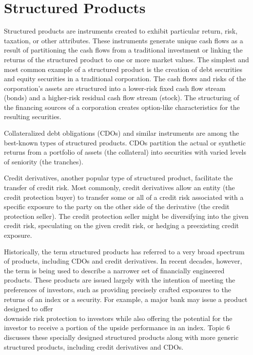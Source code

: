 \documentclass[11pt]{article}
\begin{document}
\section*{Structured Products}
Structured products are instruments created to exhibit particular return, risk, taxation, or other attributes. These instruments generate unique cash flows as a result of partitioning the cash flows from a traditional investment or linking the returns of the structured product to one or more market values. The simplest and most common example of a structured product is the creation of debt securities and equity securities in a traditional corporation. The cash flows and risks of the corporation's assets are structured into a lower-risk fixed cash flow stream (bonds) and a higher-risk residual cash flow stream (stock). The structuring of the financing sources of a corporation creates option-like characteristics for the resulting securities.

Collateralized debt obligations (CDOs) and similar instruments are among the best-known types of structured products. CDOs partition the actual or synthetic returns from a portfolio of assets (the collateral) into securities with varied levels of seniority (the tranches).

Credit derivatives, another popular type of structured product, facilitate the transfer of credit risk. Most commonly, credit derivatives allow an entity (the credit protection buyer) to transfer some or all of a credit risk associated with a specific exposure to the party on the other side of the derivative (the credit protection seller). The credit protection seller might be diversifying into the given credit risk, speculating on the given credit risk, or hedging a preexisting credit exposure.

Historically, the term structured products has referred to a very broad spectrum of products, including CDOs and credit derivatives. In recent decades, however, the term is being used to describe a narrower set of financially engineered products. These products are issued largely with the intention of meeting the preferences of investors, such as providing precisely crafted exposures to the returns of an index or a security. For example, a major bank may issue a product designed to offer\\
downside risk protection to investors while also offering the potential for the investor to receive a portion of the upside performance in an index. Topic 6 discusses these specially designed structured products along with more generic structured products, including credit derivatives and CDOs.
\end{document}
